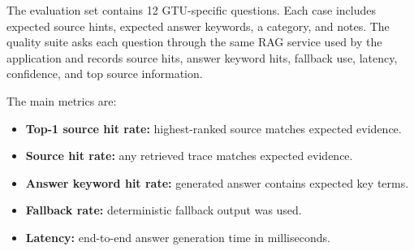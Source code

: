 The evaluation set contains 12 GTU-specific questions. Each case includes expected source hints, expected answer keywords, a category, and notes. The quality suite asks each question through the same RAG service used by the application and records source hits, answer keyword hits, fallback use, latency, confidence, and top source information.

The main metrics are:

\begin{itemize}
    \setlength{\itemsep}{0pt}
    \setlength{\parsep}{0pt}
    \setlength{\topsep}{0pt}
    \item \textbf{Top-1 source hit rate:} highest-ranked source matches expected evidence.
    \item \textbf{Source hit rate:} any retrieved trace matches expected evidence.
    \item \textbf{Answer keyword hit rate:} generated answer contains expected key terms.
    \item \textbf{Fallback rate:} deterministic fallback output was used.
    \item \textbf{Latency:} end-to-end answer generation time in milliseconds.
\end{itemize}
